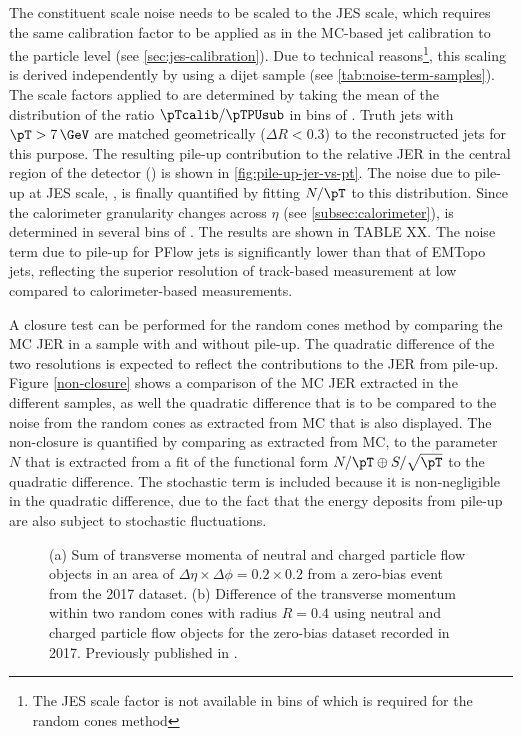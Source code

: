 The constituent scale noise needs to be scaled to the JES scale, which requires the same calibration factor to be applied as in the MC-based jet calibration to the particle level (see \cref{sec:jes-calibration}).
Due to technical reasons\footnote{The JES scale factor is not available in bins of \pTtruth which is required for the random cones method}, this scaling is derived independently by using a dijet sample (see \cref{tab:noise-term-samples}). The scale factors applied to \Npileupconstscale are determined by taking the mean of the distribution of the ratio $\pTcalib / \pTPUsub$ in bins of \pTtruth. Truth jets with $\pT > 7\,\GeV$ are matched geometrically ($\Delta R < 0.3$) to the reconstructed jets for this purpose. 
The resulting pile-up contribution to the relative JER in the central region of the detector () is shown in \cref{fig:pile-up-jer-vs-pt}.
The noise due to pile-up at JES scale, \Npileup, is finally quantified by fitting $N/\pT$ to this distribution. 
Since the calorimeter granularity changes across $\eta$ (see \cref{subsec:calorimeter}), \Npileup is determined in several bins of \absetadet. The results are shown in TABLE XX.
The noise term due to pile-up for PFlow jets is significantly lower than that of EMTopo jets, reflecting the superior resolution of track-based measurement at low \pT compared to calorimeter-based measurements. 

A closure test can be performed for the random cones method by comparing the MC JER in a sample with and without pile-up. The quadratic difference of the two resolutions is expected to reflect the contributions to the JER from pile-up. Figure \cref{non-closure} shows a comparison of the MC JER extracted in the different samples, as well the quadratic difference that is to be compared to the noise from the random cones as extracted from MC that is also displayed. The non-closure is quantified by comparing \Npileup as extracted from MC, to the parameter $N$ that is extracted from a fit of the functional form $N/\pT \oplus S/\sqrt{\pT}$ to the quadratic difference. The stochastic term is included because it is non-negligible in the quadratic difference, due to the fact that the energy deposits from pile-up are also subject to stochastic fluctuations.

\FloatBarrier
\begin{figure}[t]
    \caption{(a) Sum of transverse momenta of neutral and charged particle flow objects in an area of $\Delta \eta \times \Delta \phi = 0.2 \times 0.2$ from a zero-bias event from the 2017 dataset. (b) Difference of the transverse momentum within two random cones with radius $R = 0.4$ using neutral and charged particle flow objects for the zero-bias dataset recorded in 2017.
        Previously published in .}
    \label{fig:random-cones-balance}
\end{figure}

